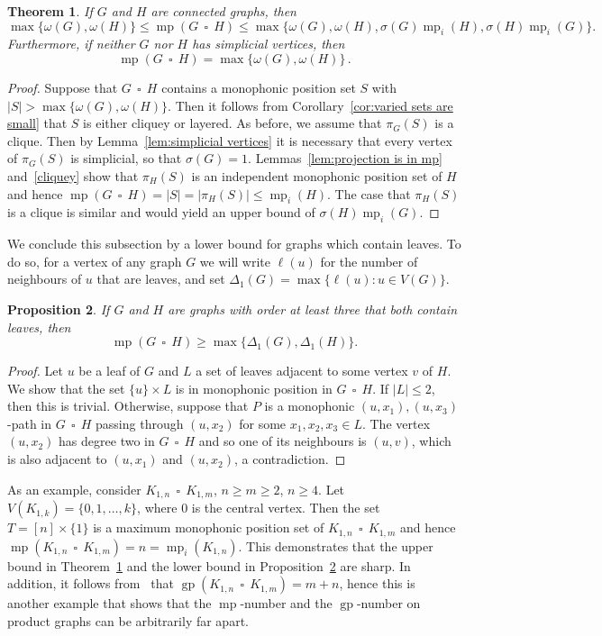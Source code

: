 \documentclass[12pt]{article}
\newtheorem{theorem}{Theorem}[section]
\newtheorem{proposition}[theorem]{Proposition}
\DeclareMathOperator {\gp} {gp}
\DeclareMathOperator {\mono} {mp}
\DeclareMathOperator{\cp}{\,\square\,}
\begin{document}
\begin{theorem} 
\label{thm:general bounds}
If $G$ and $H$ are connected graphs, then $$\max\{\omega(G), \omega(H)\}\leq \mono (G \cp H) \leq \max \{ \omega (G), \omega (H), \sigma (G) \mono_i(H), \sigma (H) \mono_i(G)\}.$$ 
    Furthermore, if neither $G$ nor $H$ has simplicial vertices, then $$\mono (G \cp H) = \max \{ \omega (G), \omega (H)\}\,.$$    
\end{theorem}

\begin{proof}
Suppose that $G\cp H$ contains a monophonic position set $S$ with $|S|> \max\{\omega(G), \omega(H)\}$. Then it follows from Corollary~\ref{cor:varied sets are small} that $S$ is either cliquey or layered. As before, we assume that $\pi _G(S)$ is a clique. Then by Lemma~\ref{lem:simplicial vertices} it is necessary that every vertex of $\pi _G(S)$ is simplicial, so that $\sigma (G) = 1$. Lemmas~\ref{lem:projection is in mp} and~\ref{cliquey} show that $\pi_H(S)$ is an independent monophonic position set of $H$ and hence $\mono(G\cp H)=|S|=|\pi_H(S)|\leq \mono_i(H)$. The case that $\pi _H(S)$ is a clique is similar and would yield an upper bound of $\sigma (H)\mono_i(G)$. 
\end{proof} 

We conclude this subsection by a lower bound for graphs which contain leaves. To do so, for a vertex of any graph $G$ we will write $\ell (u)$ for the number of neighbours of $u$ that are leaves, and set $\Delta _1(G) = \max \{ \ell (u):u \in V(G)\} $. 

\begin{proposition}\label{prop:lowerbound}
    If $G$ and $H$ are graphs with order at least three that both contain leaves, then \[ \mono (G \cp H) \geq \max \{ \Delta _1(G),\Delta _1(H)\} .\]
\end{proposition}

\begin{proof}
    Let $u$ be a leaf of $G$ and $L$ a set of leaves adjacent to some vertex $v$ of $H$. We show that the set $\{ u\} \times L$ is in monophonic position in $G\cp H$. If $|L| \leq 2$, then this is trivial. Otherwise, suppose that $P$ is a monophonic $(u,x_1),(u,x_3)$-path in $G \cp H$ passing through $(u,x_2)$ for some $x_1,x_2,x_3 \in L$. The vertex $(u,x_2)$ has degree two in $G \cp H$ and so one of its neighbours is $(u,v)$, which is also adjacent to $(u,x_1)$ and $(u,x_2)$, a contradiction. 
\end{proof}

As an example, consider $K_{1,n}\cp K_{1,m}$, $n\ge m\ge 2$, $n\ge 4$. Let $V(K_{1,k})=\{0,1,\ldots, k\}$, where $0$ is the central vertex. Then the set $T= [n]\times \{1\}$ is a maximum monophonic position set of $K_{1,n}\cp K_{1,m}$ and hence $\mono(K_{1,n}\cp K_{1,m}) = n = \mono_i(K_{1,n})$. This demonstrates that the upper bound in Theorem~\ref{thm:general bounds} and the lower bound in Proposition~\ref{prop:lowerbound} are sharp. In addition, it follows from~\cite[Theorem 2.1]{TianXuChao-2023} that $\gp(K_{1,n}\cp K_{1,m}) = m+n$, hence this is another example that shows that the $\mono $-number and the $\gp $-number on product graphs can be arbitrarily far apart.
\end{document}
